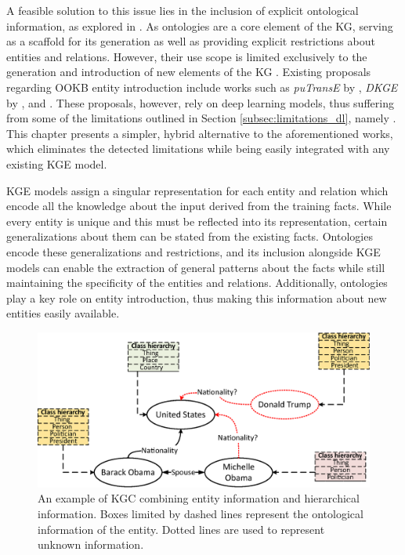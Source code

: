 A feasible solution to this issue lies in the inclusion of explicit ontological information, as explored in \cite{Patrick}. As ontologies are a core element of the KG, serving as a scaffold for its generation as well as providing explicit restrictions about entities and relations. However, their use scope is limited exclusively to the generation and introduction of new elements of the KG \citep{paulheim2017knowledge}. Existing proposals regarding OOKB entity introduction include works such as \textit{puTransE} by \cite{putranse}, \textit{DKGE} by \cite{dkge}, \cite{hamaguchi_etal} and \cite{shah_open-world_2019}. These proposals, however, rely on deep learning models, thus suffering from some of the limitations outlined in Section \ref{subsec:limitations_dl}, namely . This chapter presents a simpler, hybrid alternative to the aforementioned works, which eliminates the detected limitations while being easily integrated with any existing KGE model.

KGE models assign a singular representation for each entity and relation which encode all the knowledge about the input derived from the training facts. While every entity is unique and this must be reflected into its representation, certain generalizations about them can be stated from the existing facts. Ontologies encode these generalizations and restrictions, and its inclusion alongside KGE models can enable the extraction of general patterns about the facts while still maintaining the specificity of the entities and relations. Additionally, ontologies play a key role on entity introduction, thus making this information about new entities easily available.

\begin{figure}
    \centering
    \includegraphics[width=.8\linewidth]{4_kbsintegrationdl/figures/KGCexample.eps}
    \caption{An example of KGC combining entity information and hierarchical information. Boxes limited by dashed lines represent the ontological information of the entity. Dotted lines are used to represent unknown information.}
    \label{fig:kgc_onto_example}
\end{figure}

